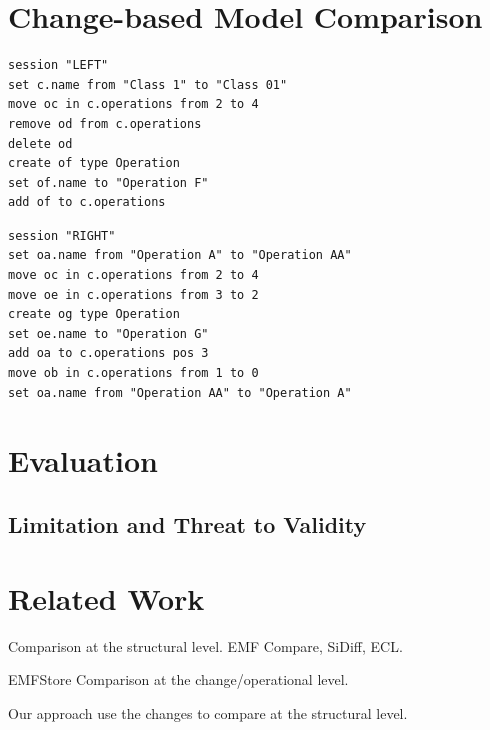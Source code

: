 \documentclass{llncs}
\begin{document}
\section{Change-based Model Comparison}
\label{sec:change-based_model_comparison}

\begin{minipage}[t]{0.49\linewidth}    
\begin{lstlisting}[firstnumber=19,style=eol,caption={The left version.},label=lst:leftcbp]
session "LEFT"
set c.name from "Class 1" to "Class 01"
move oc in c.operations from 2 to 4
remove od from c.operations
delete od
create of type Operation
set of.name to "Operation F"
add of to c.operations
\end{lstlisting}
\end{minipage}
\hfill
\begin{minipage}[t]{0.49\linewidth}
\begin{lstlisting}[firstnumber=19,style=eol,caption={The right version.},label=lst:rightcbp]
session "RIGHT"
set oa.name from "Operation A" to "Operation AA"
move oc in c.operations from 2 to 4
move oe in c.operations from 3 to 2
create og type Operation
set oe.name to "Operation G" 
add oa to c.operations pos 3
move ob in c.operations from 1 to 0
set oa.name from "Operation AA" to "Operation A"
\end{lstlisting}
\end{minipage}





\section{Evaluation}
\label{sec:evaluation}

\subsection{Limitation and Threat to Validity}
\label{sec:limitation_and_Threat_to_validity}

\section{Related Work}
\label{sec:related_work}

Comparison at the structural level. EMF Compare, SiDiff, ECL. 

EMFStore
Comparison at the change/operational level. 

Our approach use the changes to compare at the structural level.
\end{document}
